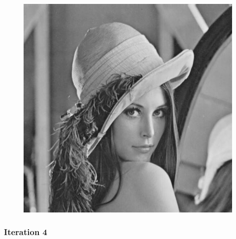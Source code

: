 \documentclass[11pt]{article}
\makeatletter
\def\maxwidth{\ifdim\Gin@nat@width>\linewidth\linewidth
    \else\Gin@nat@width\fi}
\let\Oldincludegraphics\includegraphics
\renewcommand{\includegraphics}[1]{\Oldincludegraphics[width=.8\maxwidth]{#1}}
\makeatother
\begin{document}
\begin{figure}[!htbp]
	\centering
	\includegraphics{"1th iterations_const"}
	\label{fig:1th-iterationsconst}
\end{figure}
\clearpage
    \hypertarget{iteration-4}{%
\subsubsection{Iteration 4}\label{iteration-4}}
\end{document}
